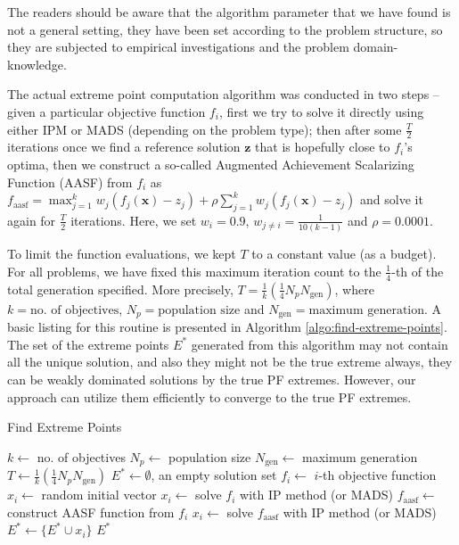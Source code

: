 \documentclass[journal]{IEEEtran}
\let\MYoriglatexcaption\caption
\renewcommand{\caption}[2][\relax]{\MYoriglatexcaption[#2]{#2}}
\begin{document}
%
The readers should be aware that the algorithm parameter that we have found is not a general setting, they have been set according to the problem structure, so they are subjected to empirical investigations and the problem domain-knowledge. 

The actual extreme point computation algorithm was conducted in two steps -- given a particular objective function \(f_i\), first we try to solve it directly using either IPM or MADS (depending on the problem type); then after some \(\frac{T}{2}\) iterations once we find a reference solution \(\mathbf{z}\) that is hopefully close to \(f_i\)'s optima, then we construct a so-called Augmented Achievement Scalarizing Function (AASF) \cite{asf} from \(f_i\) as \(f_{\text{aasf}} = \max_{j=1}^k w_j(f_j(\mathbf{x}) - z_j) + \rho \sum_{j=1}^k w_j(f_j(\mathbf{x}) - z_j)\) and solve it again for \(\frac{T}{2}\) iterations. Here, we set \(w_i = 0.9\), \(w_{j \neq i} = \frac{1}{10(k-1)}\) and \(\rho = 0.0001\). 

To limit the function evaluations, we kept \(T\) to a constant value (as a budget). For all problems, we have fixed this maximum iteration count to the \(\frac{1}{4}\)-th of the total generation specified. More precisely, $T = \frac{1}{k}(\frac{1}{4}N_p N_{\text{gen}})$, where $k = \text{no. of objectives}$, $N_p = \text{population size}$ and $N_{\text{gen}} = \text{maximum generation}$. A basic listing for this routine is presented in Algorithm \ref{algo:find-extreme-points}. The set of the extreme points \(E^\ast\) generated from this algorithm may not contain all the unique solution, and also they might not be the true extreme always, they can be weakly dominated solutions by the true PF extremes. However, our approach can utilize them efficiently to converge to the true PF extremes.
%
\begin{algorithm}[!tp]
\caption{Find Extreme Points}
\label{algo:find-extreme-points}
\begin{algorithmic}[1]
	\STATE $k \leftarrow$ no. of objectives
	\STATE $N_p \leftarrow$ population size
	\STATE $N_{\text{gen}} \leftarrow$ maximum generation
	\STATE $T \leftarrow \frac{1}{k}(\frac{1}{4}N_p N_{\text{gen}})$
	\STATE $E^\ast \leftarrow \emptyset$, an empty solution set
		\STATE $f_i \leftarrow$ $i$-th objective function
		\STATE $x_i \leftarrow $ random initial vector
		\REPEAT
			\STATE $x_i \leftarrow$ solve $f_i$ with IP method (or MADS) 
		\STATE $f_{\text{aasf}} \leftarrow $ construct AASF function from $f_i$
		\REPEAT
			\STATE $x_i \leftarrow$ solve $f_{\text{aasf}}$ with  IP method (or MADS)
		\STATE $E^\ast \leftarrow \{E^\ast \cup x_i\}$
	\ENDFOR
	\RETURN $E^\ast$
\end{algorithmic}
\end{algorithm}
%
\end{document}
